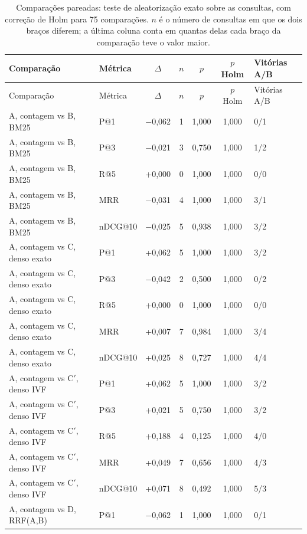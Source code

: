 {\footnotesize\setlength{\tabcolsep}{4pt}
\begin{longtable}{llccccl}
\caption{Comparações pareadas: teste de aleatorização exato sobre as consultas, com correção de Holm para 75 comparações. $n$ é o número de consultas em que os dois braços diferem; a última coluna conta em quantas delas cada braço da comparação teve o valor maior.}
\label{tab:retrieval-significance} \\
\toprule
Comparação & Métrica & $\Delta$ & $n$ & $p$ & $p$ Holm & Vitórias A/B \\
\midrule
\endfirsthead
\toprule
Comparação & Métrica & $\Delta$ & $n$ & $p$ & $p$ Holm & Vitórias A/B \\
\midrule
\endhead
A, contagem vs B, BM25 & P@1 & $-$0{,}062 & 1 & 1{,}000 & 1{,}000 & 0/1 \\
A, contagem vs B, BM25 & P@3 & $-$0{,}021 & 3 & 0{,}750 & 1{,}000 & 1/2 \\
A, contagem vs B, BM25 & R@5 & +0{,}000 & 0 & 1{,}000 & 1{,}000 & 0/0 \\
A, contagem vs B, BM25 & MRR & $-$0{,}031 & 4 & 1{,}000 & 1{,}000 & 3/1 \\
A, contagem vs B, BM25 & nDCG@10 & $-$0{,}025 & 5 & 0{,}938 & 1{,}000 & 3/2 \\
A, contagem vs C, denso exato & P@1 & +0{,}062 & 5 & 1{,}000 & 1{,}000 & 3/2 \\
A, contagem vs C, denso exato & P@3 & $-$0{,}042 & 2 & 0{,}500 & 1{,}000 & 0/2 \\
A, contagem vs C, denso exato & R@5 & +0{,}000 & 0 & 1{,}000 & 1{,}000 & 0/0 \\
A, contagem vs C, denso exato & MRR & +0{,}007 & 7 & 0{,}984 & 1{,}000 & 3/4 \\
A, contagem vs C, denso exato & nDCG@10 & +0{,}025 & 8 & 0{,}727 & 1{,}000 & 4/4 \\
A, contagem vs C$'$, denso IVF & P@1 & +0{,}062 & 5 & 1{,}000 & 1{,}000 & 3/2 \\
A, contagem vs C$'$, denso IVF & P@3 & +0{,}021 & 5 & 0{,}750 & 1{,}000 & 3/2 \\
A, contagem vs C$'$, denso IVF & R@5 & +0{,}188 & 4 & 0{,}125 & 1{,}000 & 4/0 \\
A, contagem vs C$'$, denso IVF & MRR & +0{,}049 & 7 & 0{,}656 & 1{,}000 & 4/3 \\
A, contagem vs C$'$, denso IVF & nDCG@10 & +0{,}071 & 8 & 0{,}492 & 1{,}000 & 5/3 \\
A, contagem vs D, RRF(A,B) & P@1 & $-$0{,}062 & 1 & 1{,}000 & 1{,}000 & 0/1 \\

\end{longtable}}
